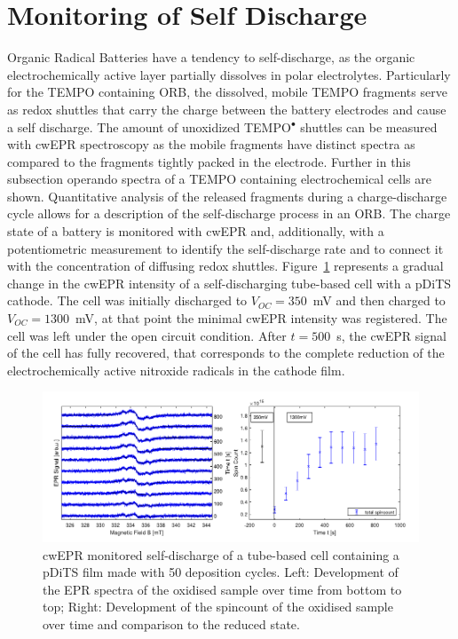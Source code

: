 \section{Monitoring of Self Discharge}
Organic Radical Batteries have a tendency to self-discharge, as the organic electrochemically active layer partially dissolves in polar electrolytes. Particularly for the TEMPO containing ORB, the dissolved, mobile TEMPO fragments serve as redox shuttles that carry the charge between the battery electrodes and cause a self discharge. The amount of unoxidized TEMPO$^\bullet$ shuttles can be measured with cwEPR spectroscopy as the mobile fragments have distinct spectra as compared to the fragments tightly packed in the electrode. Further in this subsection operando spectra of a TEMPO containing electrochemical cells are shown. Quantitative analysis of the released fragments during a charge-discharge cycle allows for a description of the self-discharge process in an ORB. The charge state of a battery is monitored with cwEPR and, additionally, with a potentiometric measurement to identify the self-discharge rate and to connect it with the concentration of diffusing redox shuttles. Figure~\ref{fig:self_discharge_DOM} represents a gradual change in the cwEPR intensity of a self-discharging tube-based cell with a pDiTS cathode. The cell was initially discharged to $V_{OC}=350$~mV and then charged to $V_{OC}=1300$~mV, at that point the minimal cwEPR intensity was registered. The cell was left under the open circuit condition. After $t=500$~s, the cwEPR signal of the cell has fully recovered, that corresponds to the complete reduction of the electrochemically active nitroxide radicals in the cathode film.

\begin{figure}[h]
\center
	\includegraphics[width=1\textwidth]{./operando_epr/figures/self_discharge/DOM_DITS_SELF_DISCHARGE.pdf}
	\caption{cwEPR monitored self-discharge of a tube-based cell containing a pDiTS film made with 50 deposition cycles. Left: Development of the EPR spectra of the oxidised sample over time from bottom to top; Right: Development of the spincount of the oxidised sample over time and comparison to the reduced state.~\cite{DOM}}
	\label{fig:self_discharge_DOM}
\end{figure}





